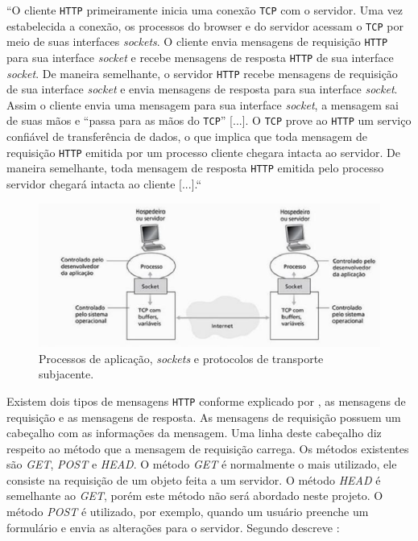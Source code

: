 \begin{citacao}
``O cliente \texttt{HTTP} primeiramente inicia uma conexão \texttt{TCP} com o servidor. Uma vez
estabelecida a conexão, os processos do browser e do servidor acessam o \texttt{TCP} por
meio de suas interfaces \textit{sockets}.
O cliente envia mensagens de requisição \texttt{HTTP} para sua interface \textit{socket} e recebe
mensagens de resposta \texttt{HTTP} de sua interface \textit{socket}. De maneira semelhante, o
servidor \texttt{HTTP} recebe mensagens de requisição de sua interface \textit{socket} e envia
mensagens de resposta para sua interface \textit{socket}. Assim o cliente envia uma
mensagem para sua interface \textit{socket}, a mensagem sai de suas mãos e “passa para as
mãos do \texttt{TCP}” [...]. O \texttt{TCP} prove ao \texttt{HTTP} um serviço confiável de transferência de
dados, o que implica que toda mensagem de requisição \texttt{HTTP} emitida por um
processo cliente chegara intacta ao servidor. De maneira semelhante, toda mensagem
de resposta \texttt{HTTP} emitida pelo processo servidor chegará intacta ao cliente [...].``
\end{citacao}

\begin{figure}[h]
	\centering
	\caption{\label{fig5}Processos de aplicação, \textit{sockets} e protocolos de transporte subjacente.}
		\includegraphics[keepaspectratio=true,scale=1]{figuras/socket.eps}
\end{figure}

Existem dois tipos de mensagens \texttt{HTTP} conforme explicado por \cite[p.~76]{kurose2010},
as mensagens de requisição e as mensagens de resposta. As mensagens de requisição possuem
um cabeçalho com as informações da mensagem. Uma linha deste cabeçalho diz respeito ao
método que a mensagem de requisição carrega. Os métodos existentes são \textit{GET}, \textit{POST} e
\textit{HEAD}. O método \textit{GET} é normalmente o mais utilizado, ele consiste na requisição de um objeto
feita a um servidor. O método \textit{HEAD} é semelhante ao \textit{GET}, porém este método não será
abordado neste projeto. O método \textit{POST} é utilizado, por exemplo, quando um usuário preenche
um formulário e envia as alterações para o servidor. Segundo descreve \cite[p.~77]{kurose2010}:

